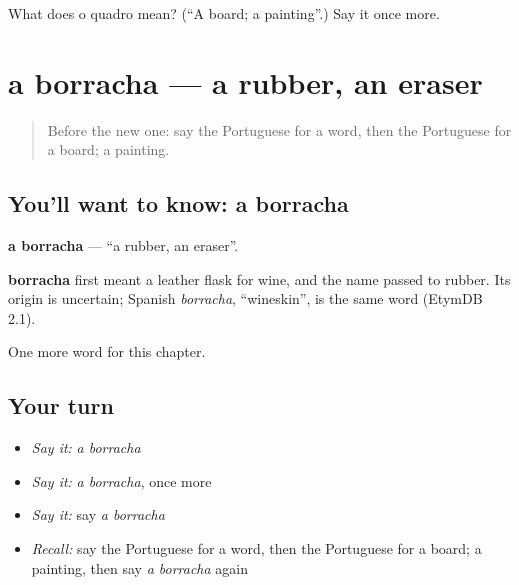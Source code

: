 \begin{tcolorbox}[breakable,colback=teal!4,colframe=teal!35!black,title={Before you move on}]
What does o quadro mean? (\textquotedblleft{}A board; a painting\textquotedblright{}.) Say it once more.
\end{tcolorbox}
\section[a borracha]{a borracha — a rubber, an eraser}

\label{lesson:PT-C113-borracha}



\begin{quote}
Before the new one: say the Portuguese for a word, then the Portuguese for a board; a painting.
\end{quote}

\subsection*{You'll want to know: a borracha}
\textbf{a borracha} — \textquotedblleft{}a rubber, an eraser\textquotedblright{}.

\begin{cousinweb}
\textbf{borracha} first meant a leather flask for wine, and the name passed to rubber. Its origin is uncertain; Spanish \emph{borracha}, \textquotedblleft{}wineskin\textquotedblright{}, is the same word (EtymDB 2.1).
\end{cousinweb}

\begin{grammarlens}[title={What you've built}]
One more word for this chapter.
\end{grammarlens}

\subsection*{Your turn}
\begin{itemize}
\raggedright
  \item \emph{Say it:} \emph{a borracha}
  \item \emph{Say it:} \emph{a borracha}, once more
  \item \emph{Say it:} say \emph{a borracha}
  \item \emph{Recall:} say the Portuguese for a word, then the Portuguese for a board; a painting, then say \emph{a borracha} again
\end{itemize}

